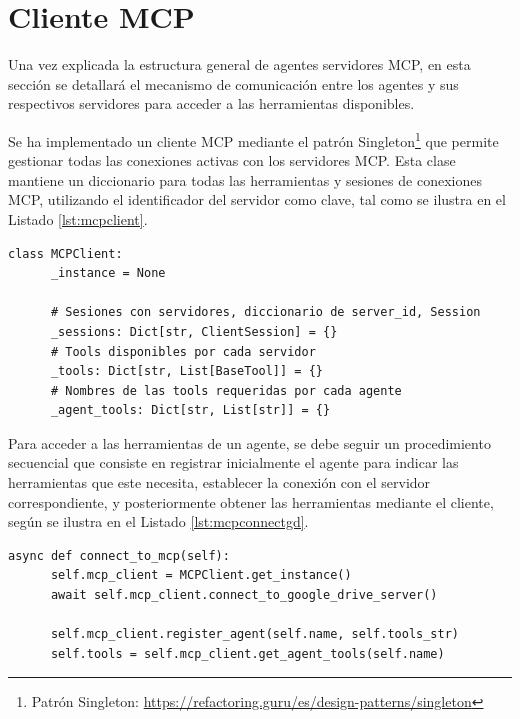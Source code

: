 \section{Cliente MCP}
\label{sec:gestionmcp}
Una vez explicada la estructura general de agentes servidores MCP, en esta sección se detallará el mecanismo de comunicación entre los agentes y sus respectivos servidores para acceder a las herramientas disponibles.

Se ha implementado un cliente MCP mediante el patrón Singleton\footnote{Patrón Singleton: \url{https://refactoring.guru/es/design-patterns/singleton}} que permite gestionar todas las conexiones activas con los servidores MCP. Esta clase mantiene un diccionario para todas las herramientas y sesiones de conexiones MCP, utilizando el identificador del servidor como clave, tal como se ilustra en el Listado \ref{lst:mcpclient}.


\begin{lstlisting}[caption={mcp\_multi\_client.py: clase Singleton MCPClient},label={lst:mcpclient}]
  class MCPClient:
      _instance = None

      # Sesiones con servidores, diccionario de server_id, Session
      _sessions: Dict[str, ClientSession] = {}
      # Tools disponibles por cada servidor
      _tools: Dict[str, List[BaseTool]] = {}
      # Nombres de las tools requeridas por cada agente
      _agent_tools: Dict[str, List[str]] = {}
\end{lstlisting}

Para acceder a las herramientas de un agente, se debe seguir un procedimiento secuencial que consiste en registrar inicialmente el agente para indicar las herramientas que este necesita, establecer la conexión con el servidor correspondiente, y posteriormente obtener las herramientas mediante el cliente, según se ilustra en el Listado \ref{lst:mcpconnectgd}.

\begin{lstlisting}[caption={google\_drive\_agent\_graph.py: función \texttt{connect\_to\_mcp en agente Google Drive}},label={lst:mcpconnectgd}]
  async def connect_to_mcp(self):
      self.mcp_client = MCPClient.get_instance()
      await self.mcp_client.connect_to_google_drive_server()

      self.mcp_client.register_agent(self.name, self.tools_str)
      self.tools = self.mcp_client.get_agent_tools(self.name)
\end{lstlisting}

